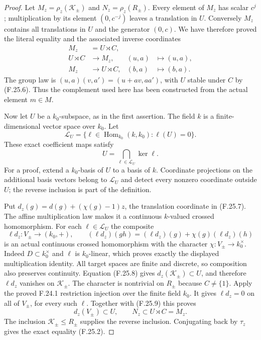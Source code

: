 \begin{proof}
Let $M_z=\rho_z(\mathcal K_\pm)$ and $N_z=\rho_z(R_\pm)$.
Every element of $M_z$ has scalar $c^j$; multiplication
by its element $(0,c^{-j})$ leaves a translation in $U$.
Conversely $M_z$ contains all translations in $U$ and
the generator $(0,c)$. We have therefore proved the
literal equality and the associated inverse coordinates
\[
 \begin{aligned}
 M_z&=U\rtimes C,\\
 U\rtimes C&\longrightarrow M_z,&(u,a)&\longmapsto(u,a),\\
 M_z&\longrightarrow U\rtimes C,&(b,a)&\longmapsto(b,a).
 \end{aligned}                                                \tag{F.25.8}
\]
The group law is $(u,a)(v,a')=(u+av,aa')$, with
$U$ stable under $C$ by (F.25.6). Thus the complement
used here has been constructed from the actual
element $m\in M$.

Now let $U$ be a $k_0$-subspace, as in the first
assertion. The field $k$ is a finite-dimensional vector
space over $k_0$. Let
\[
 \mathscr L_U=\{\ell\in\operatorname{Hom}_{k_0}(k,k_0):
                                      \ell(U)=0\}.
\]
These exact coefficient maps satisfy
\[
                         U=\bigcap_{\ell\in\mathscr L_U}
                                           \ker\ell.          \tag{F.25.9}
\]
For a proof, extend a $k_0$-basis of $U$ to a basis of
$k$. Coordinate projections on the additional basis
vectors belong to $\mathscr L_U$ and detect every
nonzero coordinate outside $U$; the reverse inclusion
is part of the definition.

Put $d_z(g)=d(g)+(\chi(g)-1)z$, the translation
coordinate in (F.25.7). The affine multiplication law
makes it a continuous $k$-valued crossed homomorphism.
For each $\ell\in\mathscr L_U$ the composite
\[
 \ell d_z:V_\pm\longrightarrow(k_0,+),\qquad
 (\ell d_z)(gh)=(\ell d_z)(g)
                         +\chi(g)(\ell d_z)(h)               \tag{F.25.10}
\]
is an actual continuous crossed homomorphism with
the character $\chi:V_\pm\to k_0^\times$.
Indeed $D\subset k_0^\times$ and $\ell$ is $k_0$-linear,
which proves exactly the displayed multiplication
identity. All target spaces are finite and discrete,
so composition also preserves continuity. Equation
(F.25.8) gives $d_z(\mathcal K_\pm)\subset U$, and
therefore $\ell d_z$ vanishes on $\mathcal K_\pm$.
The character is nontrivial on $R_\pm$ because
$C\ne\{1\}$. Apply the proved F.24.1 restriction
injection over the finite field $k_0$. It gives
$\ell d_z=0$ on all of $V_\pm$, for every such $\ell$.
Together with (F.25.9) this proves
\[
 d_z(V_\pm)\subset U,\qquad
 N_z\subset U\rtimes C=M_z.                                  \tag{F.25.11}
\]
The inclusion $\mathcal K_\pm\leq R_\pm$ supplies the
reverse inclusion. Conjugating back by $\tau_z$ gives
the exact equality (F.25.2).


\end{proof}
